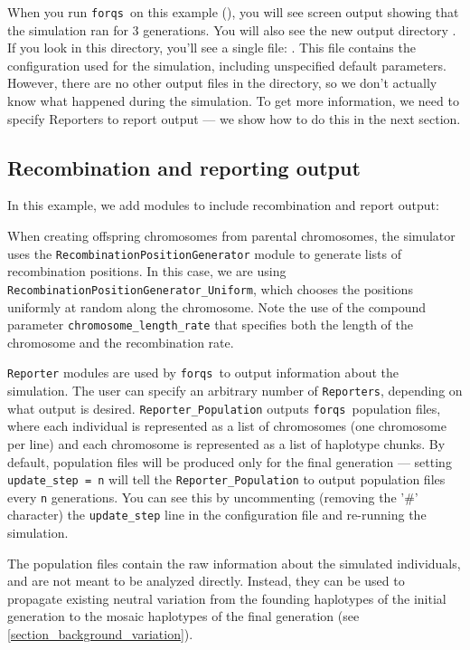 \documentclass{article}
\newcommand{\forqs}[0]{\texttt{forqs }}
\newcommand{\codeinput}[1]{\begin{small}  \end{small}}
\begin{document}
When you run \forqs on this example (),
you will see screen output showing that the simulation ran for 3 generations.
You will also see the new output directory .
If you look in this directory, you'll see a single file:
.  This file contains the configuration used for the
simulation, including unspecified default parameters.  However, there are no
other output files in the directory, so we don't actually know what happened
during the simulation.  To get more information, we need to specify Reporters to
report output --- we show how to do this in the next section.


\subsection{Recombination and reporting output}

In this example, we add modules to include recombination and report output:
\codeinput{../examples/tutorial_1_recombination_reporter.txt}

\begin{sloppypar}
When creating offspring chromosomes from parental chromosomes, the simulator
uses the \texttt{RecombinationPositionGenerator} module to generate lists of
recombination positions.  In this case, we are using
\texttt{RecombinationPositionGenerator\_Uniform}, which chooses the positions
uniformly at random along the chromosome.  Note the use of the compound
parameter \texttt{chromosome\_length\_rate} that specifies both the length of the
chromosome and the recombination rate.
\end{sloppypar}

\texttt{Reporter} modules are used by \forqs to output information about the
simulation.  The user can specify an arbitrary number of \texttt{Reporters},
depending on what output is desired.  \texttt{Reporter\_Population} outputs
\forqs population files, where each individual is represented as a list of
chromosomes (one chromosome per line) and each chromosome is represented as a
list of haplotype chunks.  By default, population files will be produced only
for the final generation --- setting \texttt{update\_step = n} will tell the
\texttt{Reporter\_Population} to output population files every \texttt{n}
generations.  You can see this by uncommenting (removing the '\#' character)
the \texttt{update\_step} line in the configuration file and re-running the
simulation.

The population files contain the raw information about the simulated
individuals, and are not meant to be analyzed directly.  Instead, they can be
used to propagate existing neutral variation from the founding haplotypes of
the initial generation to the mosaic haplotypes of the final generation
(see \autoref{section_background_variation}).
\end{document}
